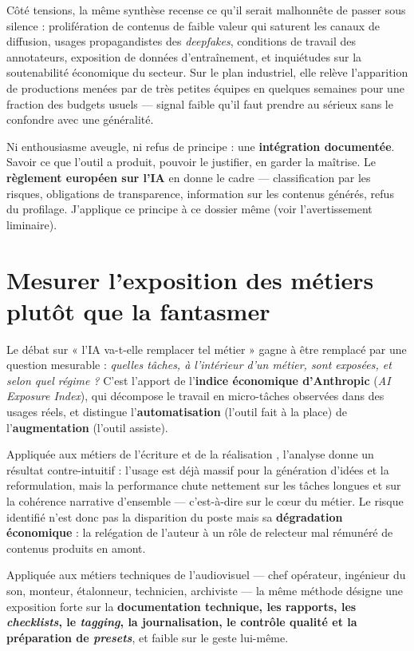 \documentclass[11pt,a4paper]{report}
\begin{document}
Côté tensions, la même synthèse recense ce qu'il serait malhonnête de passer sous silence :
prolifération de contenus de faible valeur qui saturent les canaux de diffusion, usages
propagandistes des \emph{deepfakes}, conditions de travail des annotateurs, exposition de données
d'entraînement, et inquiétudes sur la soutenabilité économique du secteur. Sur le plan industriel,
elle relève l'apparition de productions menées par de très petites équipes en quelques semaines
pour une fraction des budgets usuels --- signal faible qu'il faut prendre au sérieux sans le
confondre avec une généralité.

\begin{notebox}[title={Ma position de superviseur}]
Ni enthousiasme aveugle, ni refus de principe : une \textbf{intégration documentée}. Savoir ce
que l'outil a produit, pouvoir le justifier, en garder la maîtrise. Le \textbf{règlement européen
sur l'IA} \autocite{aiact2024} en donne le cadre --- classification par les risques, obligations de
transparence, information sur les contenus générés, refus du profilage. J'applique ce principe à
ce dossier même (voir l'avertissement liminaire).
\end{notebox}

\section{Mesurer l'exposition des métiers plutôt que la fantasmer}
Le débat sur « l'IA va-t-elle remplacer tel métier » gagne à être remplacé par une question
mesurable : \emph{quelles tâches, à l'intérieur d'un métier, sont exposées, et selon quel régime ?}
C'est l'apport de l'\textbf{indice économique d'Anthropic} (\emph{AI Exposure Index}), qui
décompose le travail en micro-tâches observées dans des usages réels, et distingue
l'\textbf{automatisation} (l'outil fait à la place) de l'\textbf{augmentation} (l'outil assiste).

Appliquée aux métiers de l'écriture et de la réalisation \autocite{ktt_scenaristes2026}, l'analyse
donne un résultat contre-intuitif : l'usage est déjà massif pour la génération d'idées et la
reformulation, mais la performance chute nettement sur les tâches longues et sur la cohérence
narrative d'ensemble --- c'est-à-dire sur le c\oe ur du métier. Le risque identifié n'est donc pas la
disparition du poste mais sa \textbf{dégradation économique} : la relégation de l'auteur à un rôle
de relecteur mal rémunéré de contenus produits en amont.

Appliquée aux métiers techniques de l'audiovisuel \autocite{ktt_techniciens2026} --- chef
opérateur, ingénieur du son, monteur, étalonneur, technicien, archiviste --- la même méthode
désigne une exposition forte sur la \textbf{documentation technique, les rapports, les
\emph{checklists}, le \emph{tagging}, la journalisation, le contrôle qualité et la préparation de
\emph{presets}}, et faible sur le geste lui-même.
\end{document}
